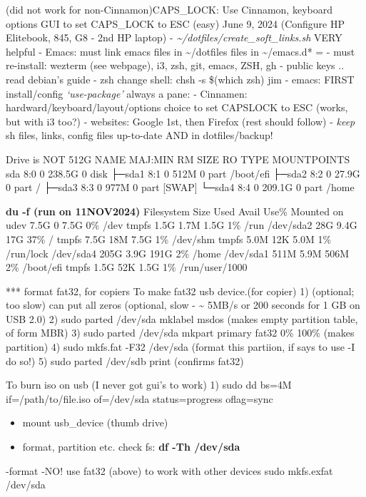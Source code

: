 \documentclass[
  letterpaper,
  DIV=11,
  numbers=noendperiod]{scrartcl}
\providecommand{\tightlist}{%
  \setlength{\itemsep}{0pt}\setlength{\parskip}{0pt}}\usepackage{longtable,booktabs,array}
\begin{document}
(did not work for non-Cinnamon)CAPS\_LOCK: Use Cinnamon, keyboard
options GUI to set CAPS\_LOCK to ESC (easy) June 9, 2024 (Configure HP
Elitebook, 845, G8 - 2nd HP laptop) -
\emph{\textasciitilde/dotfiles/create\_soft\_links.sh} VERY helpful -
Emacs: must link emacs files in \textasciitilde/dotfiles files in
\textasciitilde/emacs.d* = - must re-install: wezterm (see webpage), i3,
zsh, git, emacs, ZSH, gh - public keys .. read debian's guide - zsh
change shell: chsh -s \$(which zsh) jim - emacs: FIRST install/config
\emph{`use-package'} always a pane: - Cinnamen:
hardward/keyboard/layout/options choice to set CAPSLOCK to ESC (works,
but with i3 too?) - websites: Google 1st, then Firefox (rest should
follow) - \emph{keep} sh files, links, config files up-to-date AND in
dotfiles/backup!

Drive is NOT 512G NAME MAJ:MIN RM SIZE RO TYPE MOUNTPOINTS sda 8:0 0
238.5G 0 disk ├─sda1 8:1 0 512M 0 part /boot/efi ├─sda2 8:2 0 27.9G 0
part / ├─sda3 8:3 0 977M 0 part {[}SWAP{]} └─sda4 8:4 0 209.1G 0 part
/home

\textbf{du -f (run on 11NOV2024)} Filesystem Size Used Avail Use\%
Mounted on udev 7.5G 0 7.5G 0\% /dev tmpfs 1.5G 1.7M 1.5G 1\% /run
/dev/sda2 28G 9.4G 17G 37\% / tmpfs 7.5G 18M 7.5G 1\% /dev/shm tmpfs
5.0M 12K 5.0M 1\% /run/lock /dev/sda4 205G 3.9G 191G 2\% /home /dev/sda1
511M 5.9M 506M 2\% /boot/efi tmpfs 1.5G 52K 1.5G 1\% /run/user/1000

*** format fat32, for copiers To make fat32 usb device.(for copier) 1)
(optional; too slow) can put all zeros (optional, slow -
\textasciitilde{} 5MB/s or 200 seconds for 1 GB on USB 2.0) 2) sudo
parted /dev/sda mklabel msdos (makes empty partition table, of form MBR)
3) sudo parted /dev/sda mkpart primary fat32 0\% 100\% (makes partition)
4) sudo mkfs.fat -F32 /dev/sda (format this partiion, if says to use -I
do so!) 5) sudo parted /dev/sdb print (confirms fat32)

To burn iso on usb (I never got gui's to work) 1) sudo dd bs=4M
if=/path/to/file.iso of=/dev/sda status=progress oflag=sync

\begin{itemize}
\tightlist
\item
  mount usb\_device (thumb drive)
\item
  format, partition etc. check fs: \textbf{df -Th /dev/sda}
\end{itemize}

-format -NO! use fat32 (above) to work with other devices sudo
mkfs.exfat /dev/sda
\end{document}
